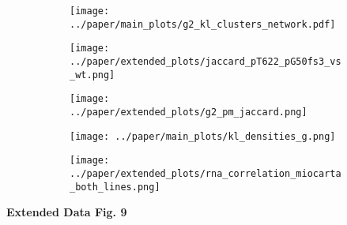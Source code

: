 \begin{figure}[H]
    \begin{subfigure}[t]{.3\textwidth}
        \caption{}
        \texttt{[image: ../paper/main\_plots/g2\_kl\_clusters\_network.pdf]}        
    \end{subfigure}
    \begin{subfigure}[t]{.3\textwidth}
        \caption{}
        \texttt{[image: ../paper/extended\_plots/jaccard\_pT622\_pG50fs3\_vs\_wt.png]}        
    \end{subfigure}
    \begin{subfigure}[t]{.3\textwidth}
        \caption{}
        \texttt{[image: ../paper/extended\_plots/g2\_pm\_jaccard.png]}        
    \end{subfigure}
    \begin{subfigure}[t]{.6\textwidth}
        \caption{}
        \texttt{[image: ../paper/main\_plots/kl\_densities\_g.png]}        
    \end{subfigure}
    \hspace{0.5cm}
    \begin{subfigure}[t]{.3\textwidth}
        \caption{}
        \texttt{[image: ../paper/extended\_plots/rna\_correlation\_miocarta\_both\_lines.png]}        
    \end{subfigure}
\end{figure}
\textbf{Extended Data Fig. 9}